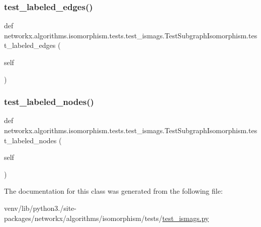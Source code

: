 \subsubsection{\texorpdfstring{test\+\_\+labeled\+\_\+edges()}{test\_labeled\_edges()}}
{\footnotesize\ttfamily def networkx.\+algorithms.\+isomorphism.\+tests.\+test\+\_\+ismags.\+Test\+Subgraph\+Isomorphism.\+test\+\_\+labeled\+\_\+edges (\begin{DoxyParamCaption}\item[{}]{self }\end{DoxyParamCaption})}

\mbox{\label{classnetworkx_1_1algorithms_1_1isomorphism_1_1tests_1_1test__ismags_1_1TestSubgraphIsomorphism_a8d5533754fb0f9aace090d4d4dcb0b22}} 
\subsubsection{\texorpdfstring{test\+\_\+labeled\+\_\+nodes()}{test\_labeled\_nodes()}}
{\footnotesize\ttfamily def networkx.\+algorithms.\+isomorphism.\+tests.\+test\+\_\+ismags.\+Test\+Subgraph\+Isomorphism.\+test\+\_\+labeled\+\_\+nodes (\begin{DoxyParamCaption}\item[{}]{self }\end{DoxyParamCaption})}



The documentation for this class was generated from the following file\+:\begin{DoxyCompactItemize}
\item 
venv/lib/python3./site-\/packages/networkx/algorithms/isomorphism/tests/\hyperlink{test__ismags_8py}{test\+\_\+ismags.\+py}\end{DoxyCompactItemize}
